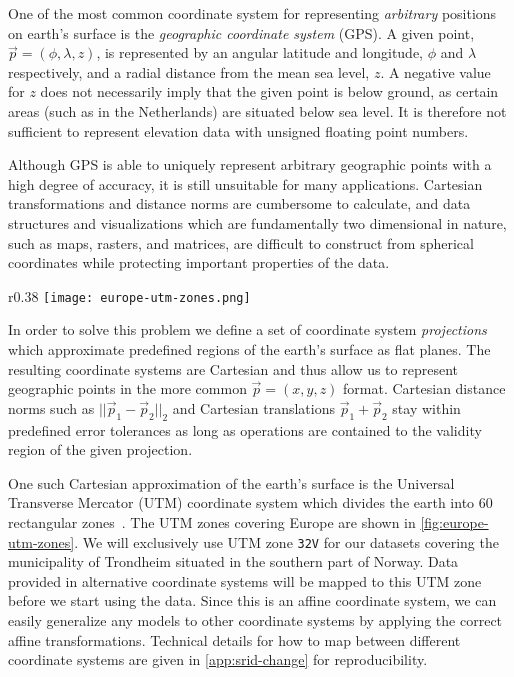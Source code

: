 One of the most common coordinate system for representing \textit{arbitrary} positions on earth's surface is the \textit{geographic coordinate system} (GPS).
A given point, $\vec{p} = (\phi, \lambda, z)$, is represented by an angular latitude and longitude, $\phi$ and $\lambda$ respectively, and a radial distance from the mean sea level, $z$.
A negative value for $z$ does not necessarily imply that the given point is below ground, as certain areas (such as in the Netherlands) are situated below sea level.
It is therefore not sufficient to represent elevation data with unsigned floating point numbers.

Although GPS is able to uniquely represent arbitrary geographic points with a high degree of accuracy, it is still unsuitable for many applications.
Cartesian transformations and distance norms are cumbersome to calculate, and data structures and visualizations which are fundamentally two dimensional in nature, such as maps, rasters, and matrices, are difficult to construct from spherical coordinates while protecting important properties of the data.

\begin{wrapfigure}[17]{r}{0.38\linewidth}
  \centering
  \texttt{[image: europe-utm-zones.png]}
  \caption[UTM zones covering Europe.]{%
    The figure shows the UTM zones required in order to cover the entirety of Europe, from \texttt{29S} to \texttt{38W}.
    This public domain image has been sourced from Wikimedia~\cite{wiki:europe_utm_zones}.
  }%
  \label{fig:europe-utm-zones}
\end{wrapfigure}

In order to solve this problem we define a set of coordinate system \textit{projections} which approximate predefined regions of the earth's surface as flat planes.
The resulting coordinate systems are Cartesian and thus allow us to represent geographic points in the more common $\vec{p} = (x, y, z)$ format.
Cartesian distance norms such as $||\vec{p}_1 - \vec{p}_2||_2$ and Cartesian translations $\vec{p}_1 + \vec{p}_2$ stay within predefined error tolerances as long as operations are contained to the validity region of the given projection.

One such Cartesian approximation of the earth's surface is the Universal Transverse Mercator (UTM) coordinate system which divides the earth into 60 rectangular zones~\cite[p.~48]{map-projections}. The UTM zones covering Europe are shown in \cref{fig:europe-utm-zones}.
We will exclusively use UTM zone \texttt{32V} for our datasets covering the municipality of Trondheim situated in the southern part of Norway.
Data provided in alternative coordinate systems will be mapped to this UTM zone before we start using the data.
Since this is an affine coordinate system, we can easily generalize any models to other coordinate systems by applying the correct affine transformations.
Technical details for how to map between different coordinate systems are given in \cref{app:srid-change} for reproducibility.
